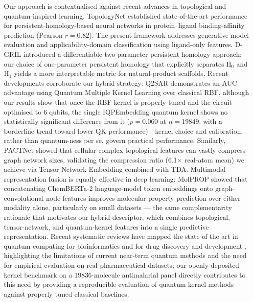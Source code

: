 \documentclass[11pt,a4paper]{article}
\begin{document}
Our approach is contextualised against recent advances in topological and quantum-inspired learning. TopologyNet \citep{topologynet_2018} established state-of-the-art performance for persistent-homology-based neural networks in protein--ligand binding-affinity prediction (Pearson $r = 0.82$). The present framework addresses generative-model evaluation and applicability-domain classification using ligand-only features. D-GRIL \citep{dgril_2026} introduced a differentiable two-parameter persistent homology approach; our choice of one-parameter persistent homology that explicitly separates H$_0$ and H$_1$ yields a more interpretable metric for natural-product scaffolds. Recent developments corroborate our hybrid strategy: Q2SAR \citep{q2sar_2025} demonstrates an AUC advantage using Quantum Multiple Kernel Learning over classical RBF, although our results show that once the RBF kernel is properly tuned and the circuit optimised to 6 qubits, the single IQPEmbedding quantum kernel shows no statistically significant difference from it ($p = \num{0.060}$ at $n = \num{19849}$, with a borderline trend toward lower QK performance)---kernel choice and calibration, rather than quantum-ness per se, govern practical performance. Similarly, PACTNet \citep{pactnet_2025} showed that cellular complex topological features can vastly compress graph network sizes, validating the compression ratio (\num{6.1}$\times$ real-atom mean) we achieve via Tensor Network Embedding combined with TDA. Multimodal representation fusion is equally effective in deep learning: MolPROP \citep{rollins2024molprop} showed that concatenating ChemBERTa-2 language-model token embeddings onto graph-convolutional node features improves molecular property prediction over either modality alone, particularly on small datasets --- the same complementarity rationale that motivates our hybrid descriptor, which combines topological, tensor-network, and quantum-kernel features into a single predictive representation. Recent systematic reviews have mapped the state of the art in quantum computing for bioinformatics \citep{naleczcharkiewicz2024} and for drug discovery and development \citep{kumar2024quantumdrug}, highlighting the limitations of current near-term quantum methods and the need for empirical evaluation on real pharmaceutical datasets; our openly deposited kernel benchmark on a \num{19836}-molecule antimalarial panel directly contributes to this need by providing a reproducible evaluation of quantum kernel methods against properly tuned classical baselines.

\end{document}
